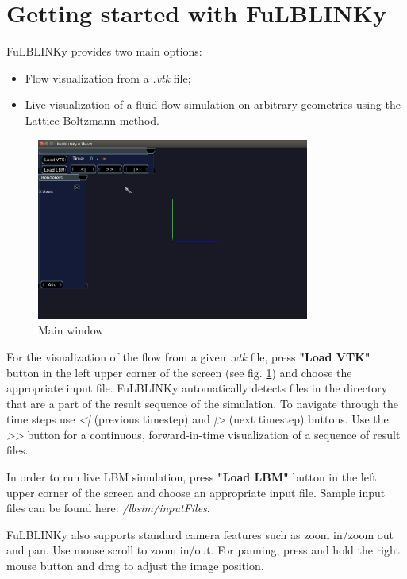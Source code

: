 \documentclass[
12pt, %
a4paper, %
oneside, %
headinclude,footinclude, %
BCOR5mm, %
]{scrartcl}
\begin{document}
\section{Getting started with FuLBLINKy}

FuLBLINKy provides two main options:
\begin{itemize}
\item Flow visualization from a \textit{.vtk} file;
\item Live visualization of a fluid flow simulation on arbitrary geometries using the Lattice Boltzmann method.
\end{itemize}
\begin{figure}
 \includegraphics[width=0.8\textwidth]{fullblinky_start.png}
   \caption{Main window}
   \label{fig:fullblinky start}
\end{figure}

For the visualization of the flow from a given \textit{.vtk} file, press \textbf{"Load VTK"} button in the left upper corner of the screen (see fig. \ref{fig:fullblinky start}) and choose the appropriate input file. FuLBLINKy automatically detects files in the directory that are a part of the result sequence of the simulation. To navigate through the time steps use \textit{<|} (previous timestep) and \textit{|>} (next timestep) buttons. Use the \textit{>>} button for a continuous, forward-in-time visualization of a sequence of result files.

In order to run live LBM simulation, press \textbf{"Load LBM"} button in the left upper corner of the screen and choose an appropriate input file. Sample input files can be found here: \textit{ /lbsim/inputFiles}.

FuLBLINKy also supports standard camera features such as zoom in/zoom out and pan. Use mouse scroll to zoom in/out. For panning, press and hold the right mouse button and drag to adjust the image position.
\end{document}
